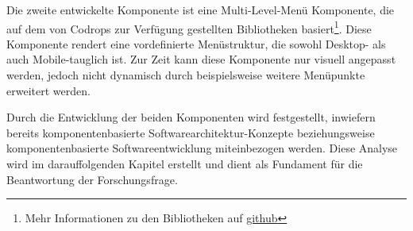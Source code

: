 Die zweite entwickelte Komponente ist eine \glqq Multi-Level\grqq -Menü Komponente, die auf dem von Codrops zur Verfügung gestellten Bibliotheken basiert\footnote{Mehr Informationen zu den Bibliotheken auf \href{https://github.com/codrops/MultiLevelPushMenu}{github}}. Diese Komponente rendert eine vordefinierte Menüstruktur, die sowohl Desktop- als auch Mobile-tauglich ist. Zur Zeit kann diese Komponente nur visuell angepasst werden, jedoch nicht dynamisch durch beispielsweise weitere Menüpunkte erweitert werden.

Durch die Entwicklung der beiden Komponenten wird festgestellt, inwiefern bereits komponentenbasierte Softwarearchitektur-Konzepte beziehungsweise komponentenbasierte Softwareentwicklung miteinbezogen werden. Diese Analyse wird im darauffolgenden Kapitel erstellt und dient als Fundament für die Beantwortung der Forschungsfrage.
